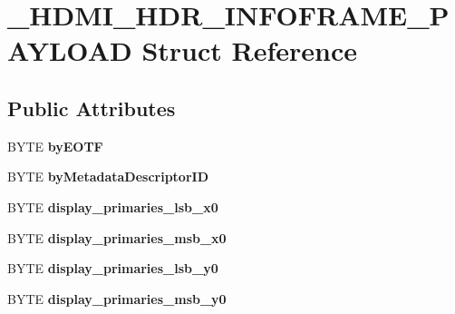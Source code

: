 \hypertarget{struct__HDMI__HDR__INFOFRAME__PAYLOAD}{\section{\-\_\-\-H\-D\-M\-I\-\_\-\-H\-D\-R\-\_\-\-I\-N\-F\-O\-F\-R\-A\-M\-E\-\_\-\-P\-A\-Y\-L\-O\-A\-D Struct Reference}
\label{struct__HDMI__HDR__INFOFRAME__PAYLOAD}
}
\subsection*{Public Attributes}
\begin{DoxyCompactItemize}
\item 
\hypertarget{struct__HDMI__HDR__INFOFRAME__PAYLOAD_ac1f7b1d4b20008cb78cbc75f7d5eed32}{B\-Y\-T\-E {\bfseries by\-E\-O\-T\-F}}\label{struct__HDMI__HDR__INFOFRAME__PAYLOAD_ac1f7b1d4b20008cb78cbc75f7d5eed32}

\item 
\hypertarget{struct__HDMI__HDR__INFOFRAME__PAYLOAD_a75600cc4674b786730db4acdda2f28eb}{B\-Y\-T\-E {\bfseries by\-Metadata\-Descriptor\-I\-D}}\label{struct__HDMI__HDR__INFOFRAME__PAYLOAD_a75600cc4674b786730db4acdda2f28eb}

\item 
\hypertarget{struct__HDMI__HDR__INFOFRAME__PAYLOAD_a0b97b03a86905d1e1d78ac8efe533ecb}{B\-Y\-T\-E {\bfseries display\-\_\-primaries\-\_\-lsb\-\_\-x0}}\label{struct__HDMI__HDR__INFOFRAME__PAYLOAD_a0b97b03a86905d1e1d78ac8efe533ecb}

\item 
\hypertarget{struct__HDMI__HDR__INFOFRAME__PAYLOAD_ac9e66043c5dfa1a10d3294643593987a}{B\-Y\-T\-E {\bfseries display\-\_\-primaries\-\_\-msb\-\_\-x0}}\label{struct__HDMI__HDR__INFOFRAME__PAYLOAD_ac9e66043c5dfa1a10d3294643593987a}

\item 
\hypertarget{struct__HDMI__HDR__INFOFRAME__PAYLOAD_adaf7f6f13c1800323f84f0a97c41a0d7}{B\-Y\-T\-E {\bfseries display\-\_\-primaries\-\_\-lsb\-\_\-y0}}\label{struct__HDMI__HDR__INFOFRAME__PAYLOAD_adaf7f6f13c1800323f84f0a97c41a0d7}

\item 
\hypertarget{struct__HDMI__HDR__INFOFRAME__PAYLOAD_a382ae72f28fbbb605240b4ab7eba4b72}{B\-Y\-T\-E {\bfseries display\-\_\-primaries\-\_\-msb\-\_\-y0}}\label{struct__HDMI__HDR__INFOFRAME__PAYLOAD_a382ae72f28fbbb605240b4ab7eba4b72}


\end{DoxyCompactItemize}
